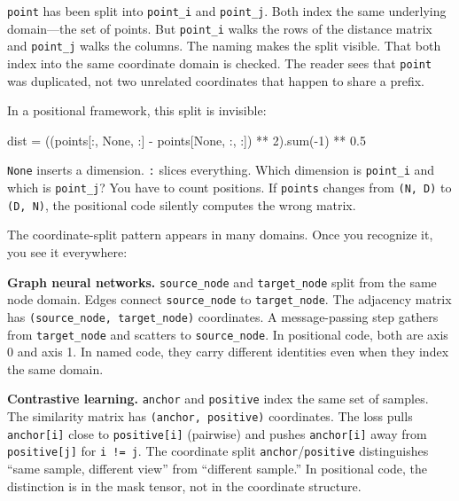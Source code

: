 \documentclass[11pt,titlepage]{article}
\newenvironment{Shaded}{}{}
\newcommand{\BuiltInTok}[1]{#1}
\newcommand{\DecValTok}[1]{\textcolor[rgb]{0.25,0.63,0.44}{#1}}
\newcommand{\FloatTok}[1]{\textcolor[rgb]{0.25,0.63,0.44}{#1}}
\newcommand{\NormalTok}[1]{#1}
\newcommand{\OperatorTok}[1]{\textcolor[rgb]{0.40,0.40,0.40}{#1}}
\newcommand{\VariableTok}[1]{\textcolor[rgb]{0.10,0.09,0.49}{#1}}
\begin{document}
\texttt{point} has been split into \texttt{point\_i} and
\texttt{point\_j}. Both index the same underlying domain---the set of
points. But \texttt{point\_i} walks the rows of the distance matrix and
\texttt{point\_j} walks the columns. The naming makes the split visible.
That both index into the same coordinate domain is checked. The reader
sees that \texttt{point} was duplicated, not two unrelated coordinates
that happen to share a prefix.

In a positional framework, this split is invisible:

\begin{Shaded}
\begin{Highlighting}[]
\NormalTok{dist }\OperatorTok{=}\NormalTok{ ((points[:, }\VariableTok{None}\NormalTok{, :] }\OperatorTok{-}\NormalTok{ points[}\VariableTok{None}\NormalTok{, :, :]) }\OperatorTok{**} \DecValTok{2}\NormalTok{).}\BuiltInTok{sum}\NormalTok{(}\OperatorTok{-}\DecValTok{1}\NormalTok{) }\OperatorTok{**} \FloatTok{0.5}
\end{Highlighting}
\end{Shaded}

\texttt{None} inserts a dimension. \texttt{:} slices everything. Which
dimension is \texttt{point\_i} and which is \texttt{point\_j}? You have
to count positions. If \texttt{points} changes from \texttt{(N,\ D)} to
\texttt{(D,\ N)}, the positional code silently computes the wrong
matrix.

The coordinate-split pattern appears in many domains. Once you recognize
it, you see it everywhere:

\textbf{Graph neural networks.} \texttt{source\_node} and
\texttt{target\_node} split from the same node domain. Edges connect
\texttt{source\_node} to \texttt{target\_node}. The adjacency matrix has
\texttt{(source\_node,\ target\_node)} coordinates. A message-passing
step gathers from \texttt{target\_node} and scatters to
\texttt{source\_node}. In positional code, both are axis 0 and axis 1.
In named code, they carry different identities even when they index the
same domain.

\textbf{Contrastive learning.} \texttt{anchor} and \texttt{positive}
index the same set of samples. The similarity matrix has
\texttt{(anchor,\ positive)} coordinates. The loss pulls
\texttt{anchor{[}i{]}} close to \texttt{positive{[}i{]}} (pairwise) and
pushes \texttt{anchor{[}i{]}} away from \texttt{positive{[}j{]}} for
\texttt{i\ !=\ j}. The coordinate split
\texttt{anchor}/\texttt{positive} distinguishes ``same sample, different
view'' from ``different sample.'' In positional code, the distinction is
in the mask tensor, not in the coordinate structure.
\end{document}
